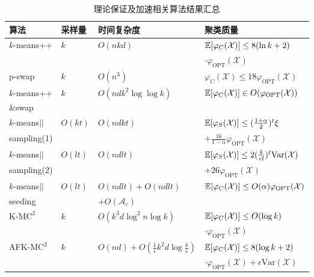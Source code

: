 \begin{table}
	\caption{理论保证及加速相关算法结果汇总}
	\label{tab: kmeans_algorithms}
	\begin{tabular}{llll}
		\toprule
		算法 & 采样量 & 时间复杂度 & 聚类质量 \\
		\midrule
		\multirow{2}{*}{$k$-means++} & \multirow{2}{*}{$k$} & \multirow{2}{*}{$O(nkd)$} & $\mathbb{E}[\varphi_C(\mathcal{X})] \leq 8(\ln k + 2)$\\
		& & & $\cdot \varphi_{\text{OPT}}(\mathcal{X})$ \\
		p-swap & $k$ & $O(n^3)$ & $\varphi_C(\mathcal{X}) \leq 18 \varphi_{\text{OPT}}(\mathcal{X})$ \\
		
		$k$-means++ & \multirow{2}{*}{$k$} & \multirow{2}{*}{$O(ndk^2 \log\log k)$} & \multirow{2}{*}{$\mathbb{E}[\varphi_C(\mathcal{X})] \in O(\varphi_{\text{OPT}}(\mathcal{X}))$}\\
		\&swap & & & \\

		$k$-means\(\vert \vert\) & \multirow{2}{*}{$O(kt)$} & \multirow{2}{*}{$O(ndkt)$} & $\mathbb{E}[\varphi_S(\mathcal{X})] \leq (\frac{1+\alpha}{2})^t \xi$\\
		sampling(1) & & & $+\frac{16}{1-\alpha} \varphi_{\text{OPT}}(\mathcal{X})$ \\
		
		$k$-means\(\vert \vert\) & \multirow{2}{*}{$O(lt)$} & \multirow{2}{*}{$O(ndlt)$} & $\mathbb{E}[\varphi_S(\mathcal{X})] \leq 2(\frac{k}{el})^t \text{Var}(\mathcal{X})$ \\
		sampling(2) & & & $+ 26\varphi_{\text{OPT}}(\mathcal{X})$\\

		$k$-means\(\vert \vert\)& \multirow{2}{*}{$O(lt)$} & $O(ndlt)+O(ndlt)$ & \multirow{2}{*}{$\mathbb{E}[\varphi_C(\mathcal{X})] \leq O(\alpha)\varphi_{\text{OPT}}(\mathcal{X})$} \\
		seeding & & $+O(\mathcal{A}_c)$ & \\

		\multirow{2}{*}{K-M$\text{C}^2$} & \multirow{2}{*}{$k$} & \multirow{2}{*}{$O(k^3 d \log^2 n \log k)$} & $\mathbb{E}[\varphi_C(\mathcal{X})] \leq O(\log k)$  \\
		& & & $\cdot \varphi_{\text{OPT}}(\mathcal{X})$ \\

		\multirow{2}{*}{AFK-M$\text{C}^2$} & \multirow{2}{*}{$k$} & \multirow{2}{*}{$O(nd)+O(\frac{1}{\epsilon}k^2 d\log \frac{k}{\epsilon})$}& $\mathbb{E}[\varphi_C(\mathcal{X})]\leq 8(\log k+2)$ \\
		& & & $\cdot \varphi_{\text{OPT}}(\mathcal{X}) + \epsilon\text{Var}(\mathcal{X})$ \\


\end{tabular}
\end{table}
